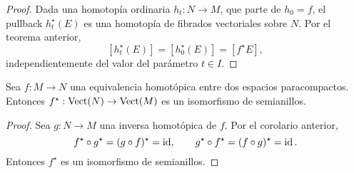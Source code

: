 \begin{proof}
Dada una homotopía ordinaria $h_t : N \to M$, que parte de $h_0 = f$, el pullback $h_t^\star(E)$ es una homotopía de fibrados vectoriales sobre $N$. Por el teorema anterior,
$$[h_t^\star(E)] = [h_0^\star(E)] = [f^\star E],$$
independientemente del valor del parámetro $t \in I$.
\end{proof}

\begin{corollary}
Sea $f : M \to N$ una equivalencia homotópica entre dos espacios paracompactos. Entonces $f^\star : \operatorname{Vect}(N) \to \operatorname{Vect}(M)$ es un isomorfismo de semianillos.
\end{corollary}

\begin{proof}
Sea $g : N \to M$ una inversa homotópica de $f$. Por el corolario anterior,
$$
f^\star \circ g^\star = (g \circ f)^\star = \operatorname{id}, \qquad
g^\star \circ f^\star = (f \circ g)^\star = \operatorname{id}.
$$
Entonces $f^\star$ es un isomorfismo de semianillos.
\end{proof}
